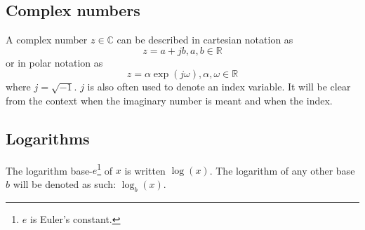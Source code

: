 \subsection{Complex numbers}

A complex number $z \in \mathbb{C}$ can be described in cartesian notation as
\[
    z = a + jb, a,b \in \mathbb{R}
\]
or in polar notation as
\[
    z = \alpha \exp(j\omega), \alpha,\omega \in \mathbb{R}
\]
where $j = \sqrt{-1}$. $j$ is also often used to denote an index variable. It
will be clear from the context when the imaginary number is meant and when the
index.

\subsection{Logarithms}

The logarithm base-$e$\footnote{$e$ is Euler's constant.} of $x$ is written
$\log(x)$. The logarithm of any other base $b$ will be denoted as such:
$\log_{b}(x)$.
